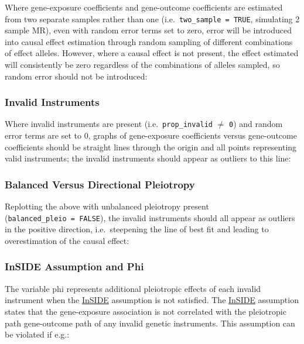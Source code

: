 \documentclass[
]{article}
\begin{document}
\leavevmode\newline Where gene-exposure coefficients and gene-outcome coefficients are estimated from two separate samples rather than one (i.e.~\texttt{two\_sample\ =\ TRUE}, simulating 2 sample MR), even with random error terms set to zero, error will be introduced into causal effect estimation through random sampling of different combinations of effect alleles. However, where a causal effect is not present, the effect estimated will consistently be zero regardless of the combinations of alleles sampled, so random error should not be introduced:

\newpage

\subsubsection{Invalid Instruments}\label{invalid-instruments}

\leavevmode\newline Where invalid instruments are present (i.e.~\texttt{prop\_invalid} \(\ne\) \texttt{0}) and random error terms are set to 0, graphs of gene-exposure coefficients versus gene-outcome coefficients should be straight lines through the origin and all points representing valid instruments; the invalid instruments should appear as outliers to this line:

\newpage

\subsubsection{Balanced Versus Directional Pleiotropy}\label{balanced-versus-directional-pleiotropy}

\leavevmode\newline Replotting the above with unbalanced pleiotropy present (\texttt{balanced\_pleio\ =\ FALSE}), the invalid instruments should all appear as outliers in the positive direction, i.e.~steepening the line of best fit and leading to overestimation of the causal effect:

\newpage

\subsubsection{InSIDE Assumption and Phi}\label{inside-assumption-and-phi}

\leavevmode\newline The variable phi represents additional pleiotropic effects of each invalid instrument when the \hyperref[acronyms_InSIDE]{InSIDE} assumption is not satisfied. The \hyperref[acronyms_InSIDE]{InSIDE} assumption states that the gene-exposure association is not correlated with the pleiotropic path gene-outcome path of any invalid genetic instruments. This assumption can be violated if e.g.:
\end{document}
